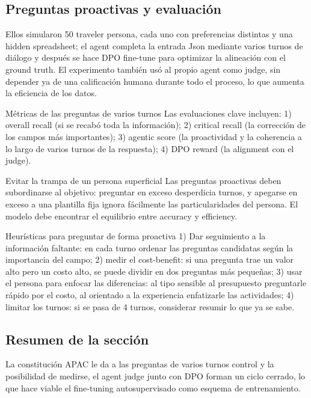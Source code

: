 \documentclass[a4paper]{article}
\begin{document}
\subsection{Preguntas proactivas y evaluación}

Ellos simularon 50 traveler persona, cada uno con preferencias distintas y una hidden spreadsheet; el agent completa la entrada Json mediante varios turnos de diálogo y después se hace DPO fine-tune para optimizar la alineación con el ground truth. El experimento también usó al propio agent como judge, sin depender ya de una calificación humana durante todo el proceso, lo que aumenta la eficiencia de los datos.
\begin{knowledgebox}{Métricas de las preguntas de varios turnos}
Las evaluaciones clave incluyen: 1) overall recall (si se recabó toda la información); 2) critical recall (la corrección de los campos más importantes); 3) agentic score (la proactividad y la coherencia a lo largo de varios turnos de la respuesta); 4) DPO reward (la alignment con el judge).
\end{knowledgebox}
\begin{warningbox}{Evitar la trampa de un persona superficial}
Las preguntas proactivas deben subordinarse al objetivo: preguntar en exceso desperdicia turnos, y apegarse en exceso a una plantilla fija ignora fácilmente las particularidades del persona. El modelo debe encontrar el equilibrio entre accuracy y efficiency.
\end{warningbox}
\begin{knowledgebox}{Heurísticas para preguntar de forma proactiva}
1) Dar seguimiento a la información faltante: en cada turno ordenar las preguntas candidatas según la importancia del campo; 2) medir el cost-benefit: si una pregunta trae un valor alto pero un costo alto, se puede dividir en dos preguntas más pequeñas; 3) usar el persona para enfocar las diferencias: al tipo sensible al presupuesto preguntarle rápido por el costo, al orientado a la experiencia enfatizarle las actividades; 4) limitar los turnos: si se pasa de 4 turnos, considerar resumir lo que ya se sabe.
\end{knowledgebox}

\subsection{Resumen de la sección}

La constitución APAC le da a las preguntas de varios turnos control y la posibilidad de medirse, el agent judge junto con DPO forman un ciclo cerrado, lo que hace viable el fine-tuning autosupervisado como esquema de entrenamiento.
\end{document}
